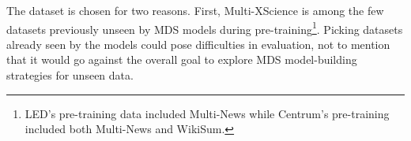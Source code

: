 \documentclass[12pt, twocolumn]{article}
\numberwithin{equation}{section}
\begin{document}

The dataset is chosen for two reasons.  First, Multi-XScience is among the few datasets previously unseen by MDS models during pre-training\footnote{LED’s pre-training data included Multi-News while Centrum’s pre-training included both Multi-News and WikiSum.}. Picking datasets already seen by the models could pose difficulties in evaluation, not to mention that it would go against the overall goal to explore MDS model-building strategies for unseen data. 
\end{document}
